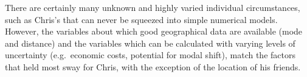 There are certainly many unknown and highly varied individual circumstances,
such as Chris's that can never be squeezed into simple numerical models.
However, the variables about which good geographical data are available
(mode and distance) and the variables which can be calculated
with varying levels of uncertainty (e.g.~economic costs,
potential for modal shift), match the factors that held most
sway for Chris, with the exception of the location of his friends.

% 
% 

